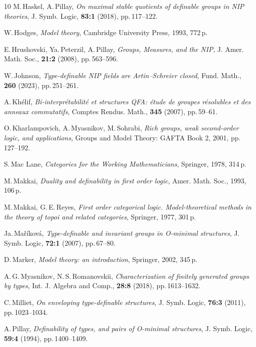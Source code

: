 \documentclass[12pt]{article}
\theoremstyle{definition}
\begin{document}
\begin{thebibliography}{10}
M.\,Haskel, A.\,Pillay, {\it On maximal stable quotients of definable groups in NIP theories}, J. Symb. Logic, {\bf 83:1} (2018), pp.\,117--122.

 W.\,Hodges, {\it Model theory}, Cambridge University Press, 1993, 772\,p.

E.\,Hrushovski, Ya.\,Peterzil,  A.\,Pillay, {\it Groups, Measures, and the NIP}, J. Amer. Math. Soc., {\bf 21:2} (2008), pp.\,563--596.

W.\,Johnson, {\it Type-definable NIP fields are Artin–Schreier closed}, Fund. Math., {\bf 260} (2023), pp.\,251--261.

A.\,Kh\'elif, {\it Bi-interpr\'etabilit\'e et structures QFA: \'etude de groupes r\'esolubles et des anneaux commutatifs}, Comptes Rendus. Math., {\bf 345} (2007), pp.\,59--61.

O.\,Kharlampovich, A.\,Myasnikov, M.\,Sohrabi, {\it Rich groups, weak second-order logic, and applications}, Groups and Model Theory: GAFTA Book 2, 2001, pp.\,127--192.

S.\,Mac Lane, {\it Categories for the Working Mathematicians}, Springer, 1978, 314\,p.

M.\,Makkai, {\it Duality and definability in first order logic}, Amer. Math. Soc., 1993, 106\,p.

M.\,Makkai, G.\,E.\,Reyes, {\it First order categorical logic. Model-theoretical methods in the theory of topoi and related categories},  Springer, 1977, 301\,p.

Ja.\,Ma\v{r}\'{i}kov\'{a}, {\it Type-definable and invariant groups in O-minimal structures}, J. Symb. Logic, {\bf 72:1} (2007), pp.\,67--80.

D.\,Marker, {\it Model theory: an introduction}, Springer, 2002, 345\,p.

A.\,G.\,Myasnikov, N.\,S.\,Romanovskii, {\it Characterization of finitely generated groups by types}, Int. J. Algebra and Comp., {\bf 28:8} (2018), pp.\,1613--1632.

C.\,Milliet, {\it On enveloping type-definable structures},
J. Symb. Logic, {\bf 76:3} (2011), pp.\,1023--1034. 

A.\,Pillay, {\it Definability of types, and pairs of O-minimal structures}, J. Symb. Logic, {\bf  59:4} (1994), pp.\,1400--1409.


\end{thebibliography}
\end{document}
